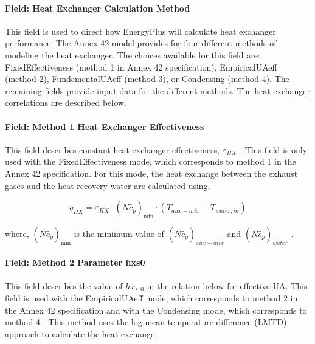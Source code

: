 \paragraph{Field: Heat Exchanger Calculation Method}\label{field-heat-exchanger-calculation-method}

This field is used to direct how EnergyPlus will calculate heat exchanger performance. The Annex 42 model provides for four different methods of modeling the heat exchanger. The choices available for this field are: FixedEffectiveness (method 1 in Annex 42 specification), EmpiricalUAeff (method 2), FundementalUAeff (method 3), or Condensing (method 4). The remaining fields provide input data for the different methods. The heat exchanger correlations are described below.

\paragraph{Field: Method 1 Heat Exchanger Effectiveness}\label{field-method-1-heat-exchanger-effectiveness}

This field describes constant heat exchanger effectiveness, \({\varepsilon_{HX}}\) . This field is only used with the FixedEffectiveness mode, which corresponds to method 1 in the Annex 42 specification. For this mode, the heat exchange between the exhaust gases and the heat recovery water are calculated using,

\begin{equation}
{q_{HX}} = {\varepsilon_{HX}} \cdot {\left( {\dot N{{\hat c}_p}} \right)_{\min }} \cdot \left( {{T_{aux - mix}} - {T_{water,in}}} \right)
\end{equation}

where, \({\left( {\dot N{{\hat c}_p}} \right)_{\min }}\) is the minimum value of \({\left( {\dot N{{\hat c}_p}} \right)_{aux - mix}}\) and \({\left( {\dot N{{\hat c}_p}} \right)_{water}}\) .

\paragraph{Field: Method 2 Parameter hxs0}\label{field-method-2-parameter-hxs0}

This field describes the value of \(h{x_{s,0}}\) in the relation below for effective UA. This field is used with the EmpiricalUAeff mode, which corresponds to method 2 in the Annex 42 specification and with the Condensing mode, which corresponds to method 4 . This method uses the log mean temperature difference (LMTD) approach to calculate the heat exchange:

